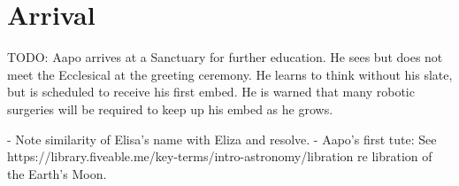 %
%

\chapter{Arrival}

TODO: Aapo arrives at a Sanctuary for further education. He sees but does not meet the Ecclesical at the greeting ceremony. He learns to think without his slate, but is scheduled to receive his first embed. He is warned that many robotic surgeries will be required to keep up his embed as he grows.

- Note similarity of Elisa's name with Eliza and resolve.
- Aapo's first tute: See https://library.fiveable.me/key-terms/intro-astronomy/libration re libration of the Earth's Moon.


\newpage
\thispagestyle{empty}

